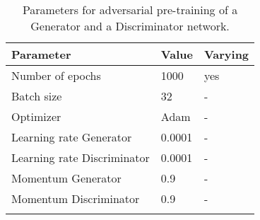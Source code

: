 \begin{table}[ht!]
\small
\begin{center}
\caption{Parameters for adversarial pre-training of a Generator and a Discriminator network.}
\begin{tabular}{ M{6cm}  M{2cm} M{2cm}}
\toprule
\textbf{Parameter} & \textbf{Value} & \textbf{Varying} \\
\midrule
Number of epochs & 1000 & yes\\
Batch size & 32 & -\\
\midrule
Optimizer & Adam & -\\
Learning rate Generator & 0.0001 & -\\
Learning rate Discriminator & 0.0001 & -\\
Momentum Generator & 0.9 & -\\
Momentum Discriminator & 0.9 & -\\
\bottomrule
\label{tab:exp_details_params_pre_train}
\end{tabular}
\end{center}
\vspace{-4mm}
\end{table}
\FloatBarrier
\noindent